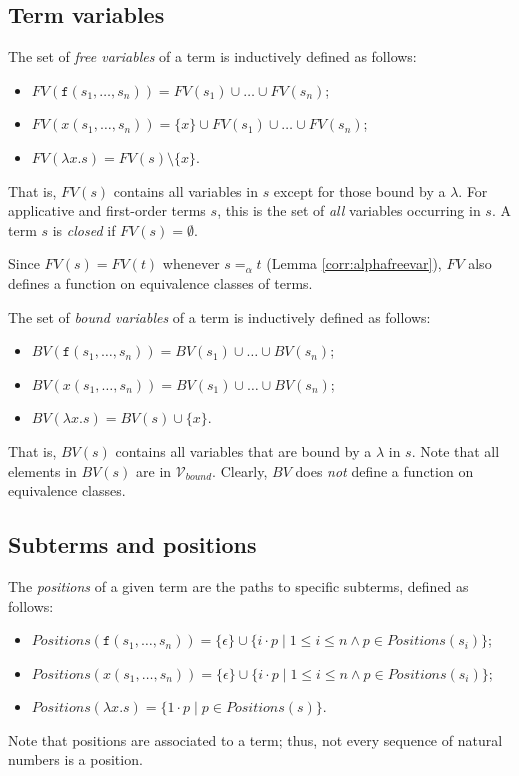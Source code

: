 \documentclass{lmcs}
\theoremstyle{theorem}\newtheorem{theorem}[dummy]{Theorem}
\theoremstyle{theorem}\newtheorem{lemma}[dummy]{Lemma}
\theoremstyle{theorem}\newtheorem{corollary}[dummy]{Corollary}
\theoremstyle{definition}\newtheorem{definition}[dummy]{Definition}
\theoremstyle{definition}\newtheorem{example}[dummy]{Example}
\newcommand{\Vbound}{\mathcal{V}_{\mathit{bound}}}
\newcommand{\FV}{\mathit{FV}}
\newcommand{\BV}{\mathit{BV}}
\newcommand{\Positions}{\mathit{Positions}}
\newcommand{\identifier}[1]{\mathtt{#1}}
\newcommand{\afun}{\identifier{f}}
\newcommand{\avar}{x}
\newcommand{\abs}[2]{\lambda #1.#2}
\begin{document}
\subsection{Term variables}
The set of \emph{free variables} of a term is inductively defined as follows:
\begin{itemize}
\item $\FV(\afun(s_1,\dots,s_n)) = \FV(s_1) \cup \dots \cup \FV(s_n)$;
\item $\FV(\avar(s_1,\dots,s_n)) = \{ \avar \} \cup \FV(s_1) \cup \dots \cup \FV(s_n)$;
\item $\FV(\abs{\avar}{s}) = \FV(s) \setminus \{ \avar \}$.
\end{itemize}
That is, $\FV(s)$ contains all variables in $s$ except for those bound by a $\lambda$.
For applicative and first-order terms $s$, this is the set of \emph{all} variables occurring in
$s$.  A term $s$ is \emph{closed} if $\FV(s) = \emptyset$.

Since $\FV(s) = \FV(t)$ whenever $s =_\alpha t$ (Lemma \ref{corr:alphafreevar}),
$\FV$ also defines a function on equivalence classes of terms.

The set of \emph{bound variables} of a term is inductively defined as follows:
\begin{itemize}
\item $\BV(\afun(s_1,\dots,s_n)) = \BV(s_1) \cup \dots \cup \BV(s_n)$;
\item $\BV(\avar(s_1,\dots,s_n)) = \BV(s_1) \cup \dots \cup \BV(s_n)$;
\item $\BV(\abs{\avar}{s}) = \BV(s) \cup \{ \avar \}$.
\end{itemize}
That is, $\BV(s)$ contains all variables that are bound by a $\lambda$ in $s$.  Note that all
elements in $\BV(s)$ are in $\Vbound$.
Clearly, $\BV$ does \emph{not} define a function on equivalence classes.

\subsection{Subterms and positions}

The \emph{positions} of a given term are the paths to specific subterms, defined as follows:

\begin{itemize}
\item $\Positions(\afun(s_1,\dots,s_n)) = \{ \epsilon \} \cup \{ i \cdot p \mid 1 \leq i
  \leq n \wedge p \in \mathit{Positions}(s_i) \}$;
\item $\Positions(\avar(s_1,\dots,s_n)) = \{ \epsilon \} \cup \{ i \cdot p \mid 1 \leq i
  \leq n \wedge p \in \Positions(s_i) \}$;
\item $\Positions(\abs{\avar}{s}) = \{ 1 \cdot p \mid p \in \Positions(s) \}$.
\end{itemize}
Note that positions are associated to a term; thus, not every sequence of natural numbers is a
position.
\end{document}
